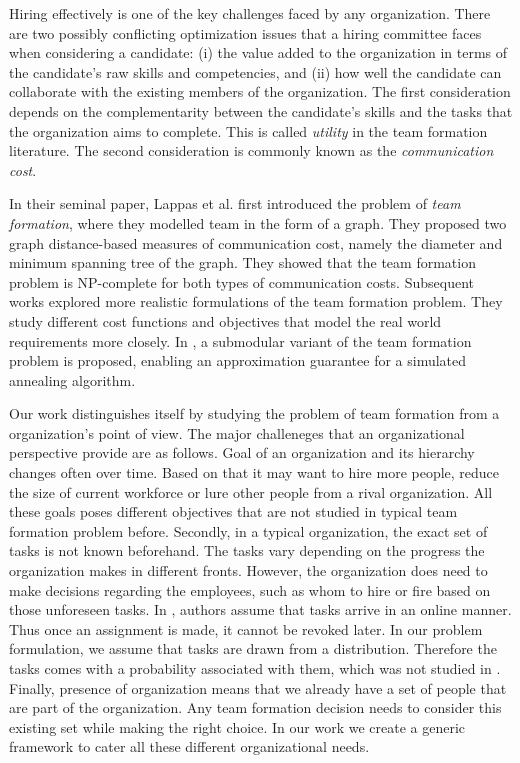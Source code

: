 Hiring effectively is one of the key challenges faced by any organization.
There are two possibly conflicting optimization issues that a hiring committee faces when considering a candidate: 
(i) the value added to the organization in terms of the candidate's raw skills and competencies, and 
(ii) how well the candidate can collaborate with the existing members of the organization.
The first consideration depends on the complementarity between the candidate's skills and the tasks that the organization aims to complete. 
This is called \textit{utility} in the team formation literature.
The second consideration is commonly known as the \textit{communication cost}.

In their seminal paper, Lappas et al. \cite{lappas2009finding} first introduced the problem of \textit{team formation}, where they modelled team in the form of a graph.
They proposed two graph distance-based measures of communication cost, namely the diameter and minimum spanning tree of the graph. 
They showed that the team formation problem is NP-complete for both types of communication costs. 
Subsequent works  \cite{sozio2010community, kargar2011discovering, anagnostopoulos2010power, rangapuram2013towards} explored more realistic formulations of the team  formation problem. They study different cost functions and objectives that model the real world requirements more closely.
In \cite{bhowmik2014submodularity}, a submodular variant of the team formation problem is proposed, enabling an approximation guarantee for a simulated annealing algorithm.

Our work distinguishes itself by studying the problem of team formation from a organization's point of view. The major challeneges that an organizational perspective provide are as follows. Goal of an organization and its hierarchy changes often over time. Based on that it may want to hire more people, reduce the size of current workforce or lure other people from a rival organization. All these goals poses different objectives that are not studied in typical team formation problem before. Secondly, in a typical organization, the exact set of tasks is not known beforehand. The tasks vary depending on the progress the organization makes in different fronts. However, the organization does need to make decisions regarding the employees, such as whom to hire or fire based on those unforeseen tasks. In \cite{anagnostopoulos2012online}, authors assume that tasks arrive in an online manner. Thus once an assignment is made, it cannot be revoked later. In our problem formulation, we assume that tasks are drawn from a distribution. Therefore the tasks comes with a probability associated with them, which was not studied in \cite{anagnostopoulos2012online}. Finally, presence of organization means that we already have a set of people that are part of the organization. Any team formation decision needs to consider this existing set while making the right choice. In our work we create a generic framework to cater all these different organizational needs.

